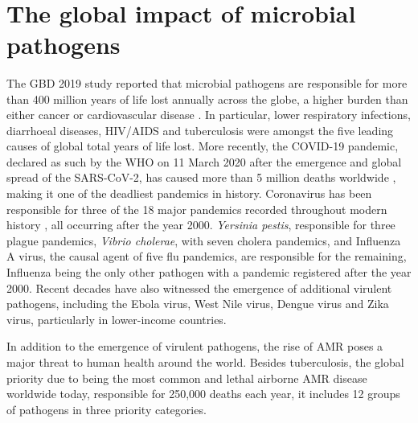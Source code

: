 \renewcommand*{\thefootnote}{\arabic{footnote}}

\mbox{}\\
\vspace{8cm}

\section{The global impact of microbial pathogens} \label{sec:_intro_global_impact}

The \ac{GBD} 2019 study reported that microbial pathogens are responsible for more than 400 million years of life lost annually across the globe, a higher burden than either cancer or cardiovascular disease \citep{vos_global_2020}. 
In particular, lower respiratory infections, diarrhoeal diseases, HIV/AIDS and tuberculosis were amongst the five leading causes of global total years of life lost. 
More recently, the COVID-19 pandemic, declared as such by the \ac{WHO} on 11 March 2020 after the emergence and global spread of the \ac{SARS-CoV-2}, has caused more than 5 million deaths worldwide \citep{ritchie_coronavirus_2020}, making it one of the deadliest pandemics in history.
Coronavirus has been responsible for three of the 18 major pandemics recorded throughout modern history \citep{piret_pandemics_2021}, all occurring after the year 2000.
\textit{Yersinia pestis}, responsible for three plague pandemics, \textit{Vibrio cholerae}, with seven cholera pandemics, and Influenza A virus, the causal agent of five flu pandemics, are responsible for the remaining, Influenza being the only other pathogen with a pandemic registered after the year 2000. 
Recent decades have also witnessed the emergence of additional virulent pathogens, including the Ebola virus, West Nile virus, Dengue virus and Zika virus, particularly in lower-income countries.

In addition to the emergence of virulent pathogens, the rise of \ac{AMR} poses a major threat to human health around the world. 
Besides tuberculosis, the global priority due to being the most common and lethal airborne \ac{AMR} disease worldwide today, responsible for 250,000 deaths each year, it includes 12 groups of pathogens in three priority categories. 

